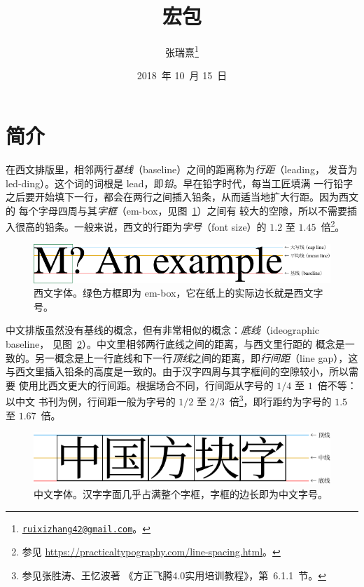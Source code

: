 \documentclass[zihao=5,no-math,a4paper]{ctexart}
\title{\vspace*{-18bp}\pkg{zhlineskip} 宏包}
\author{张瑞熹\thanks{\href{mailto:ruixizhang42@gmail.com}{\nolinkurl{ruixizhang42@gmail.com}}。}}
\date{2018~年 10~月 15~日}
\begin{document}
\maketitle

\tableofcontents

\section{简介}

在西文排版里，相邻两行\emph{基线}（baseline）之间的距离称为\emph{行距}（leading，
发音为 led-ding）。这个词的词根是 lead，即\emph{铅}。早在铅字时代，每当工匠填满
一行铅字之后要开始填下一行，都会在两行之间插入铅条，从而适当地扩大行距。因为西文的
每个字母四周与其\emph{字框}（em-box，见图~\ref{fig:eng-font-size}）之间有
较大的空隙，所以不需要插入很高的铅条。一般来说，西文的行距为\emph{字号}（font
size）的 $1.2$ 至 $1.45$~倍\footnote{参见
\url{https://practicaltypography.com/line-spacing.html}。}。

\begin{figure}[h]
\centering
\includegraphics{Latinmetrics}
\caption[西文字体]{西文字体。绿色方框即为 em-box，它在纸上的实际边长就是西文字号。}
\label{fig:eng-font-size}
\end{figure}

中文排版虽然没有基线的概念，但有非常相似的概念：\emph{底线}（ideographic baseline，
见图~\ref{fig:chi-font-size}）。中文里相邻两行底线之间的距离，与西文里行距的
概念是一致的。另一概念是上一行底线和下一行\emph{顶线}之间的距离，即\emph{行间距}（line
gap），这与西文里插入铅条的高度是一致的。由于汉字四周与其字框间的空隙较小，所以需要
使用比西文更大的行间距。根据场合不同，行间距从字号的 $1/4$ 至 $1$~倍不等：以中文
书刊为例，行间距一般为字号的 $1/2$ 至 $2/3$~倍\footnote{参见张胜涛、王忆波著
《方正飞腾4.0实用培训教程》，第~6.1.1~节。}，即行距约为字号的 $1.5$ 至 $1.67$~倍。

\begin{figure}[h]
\centering
\includegraphics{CJKmetrics}
\caption[中文字体]{中文字体。汉字字面几乎占满整个字框，字框的边长即为中文字号。}
\label{fig:chi-font-size}
\end{figure}
\end{document}
